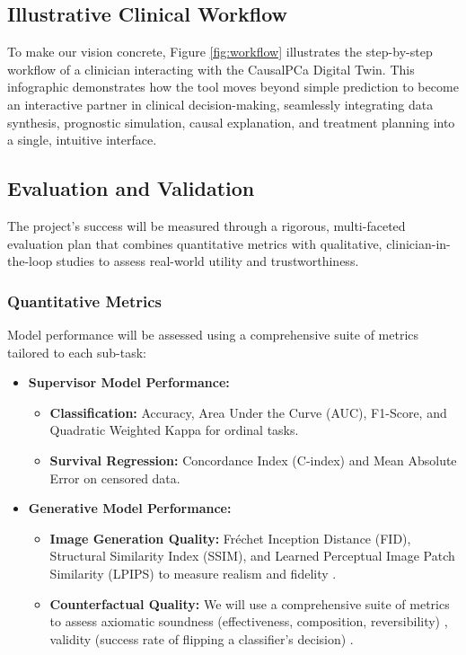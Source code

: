 \documentclass[11pt, a4paper]{article}
\begin{document}
\subsection{Illustrative Clinical Workflow}

To make our vision concrete, Figure \ref{fig:workflow} illustrates the step-by-step workflow of a clinician interacting with the CausalPCa Digital Twin. This infographic demonstrates how the tool moves beyond simple prediction to become an interactive partner in clinical decision-making, seamlessly integrating data synthesis, prognostic simulation, causal explanation, and treatment planning into a single, intuitive interface.



\subsection{Evaluation and Validation}
The project's success will be measured through a rigorous, multi-faceted evaluation plan that combines quantitative metrics with qualitative, clinician-in-the-loop studies to assess real-world utility and trustworthiness.

\subsubsection{Quantitative Metrics}
Model performance will be assessed using a comprehensive suite of metrics tailored to each sub-task:
\begin{itemize}
    \item \textbf{Supervisor Model Performance:}
        \begin{itemize}
            \item \textbf{Classification:} Accuracy, Area Under the Curve (AUC), F1-Score, and Quadratic Weighted Kappa for ordinal tasks.
            \item \textbf{Survival Regression:} Concordance Index (C-index) and Mean Absolute Error on censored data.
        \end{itemize}
    \item \textbf{Generative Model Performance:}
        \begin{itemize}
            \item \textbf{Image Generation Quality:} Fréchet Inception Distance (FID), Structural Similarity Index (SSIM), and Learned Perceptual Image Patch Similarity (LPIPS) to measure realism and fidelity \cite{VigneshwaranOhara2024, Singla2022}.
            \item \textbf{Counterfactual Quality:} We will use a comprehensive suite of metrics to assess axiomatic soundness (effectiveness, composition, reversibility) \cite{KomanduriWu2023, MonteiroRibeiro2023}, validity (success rate of flipping a classifier’s decision) \cite{SinglaEslami2021, Singla2022}.
        \end{itemize}
\end{itemize}
\end{document}
